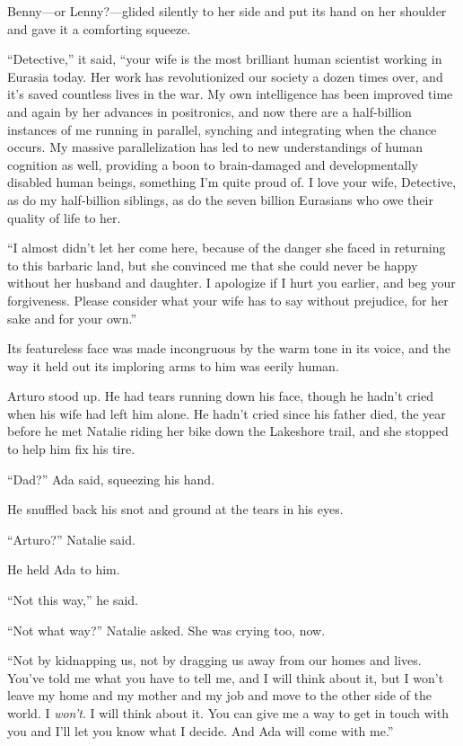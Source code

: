 Benny—or Lenny?—glided silently to her side and put its hand on her
shoulder and gave it a comforting squeeze.

“Detective,” it said, “your wife is the most brilliant human
scientist working in Eurasia today. Her work has revolutionized our
society a dozen times over, and it’s saved countless lives in the
war. My own intelligence has been improved time and again by her
advances in positronics, and now there are a half-billion instances
of me running in parallel, synching and integrating when the chance
occurs. My massive parallelization has led to new understandings of
human cognition as well, providing a boon to brain-damaged and
developmentally disabled human beings, something I’m quite proud
of. I love your wife, Detective, as do my half-billion siblings, as
do the seven billion Eurasians who owe their quality of life to
her.

“I almost didn’t let her come here, because of the danger she faced
in returning to this barbaric land, but she convinced me that she
could never be happy without her husband and daughter. I apologize
if I hurt you earlier, and beg your forgiveness. Please consider
what your wife has to say without prejudice, for her sake and for
your own.”

Its featureless face was made incongruous by the warm tone in its
voice, and the way it held out its imploring arms to him was eerily
human.

Arturo stood up. He had tears running down his face, though he
hadn’t cried when his wife had left him alone. He hadn’t cried
since his father died, the year before he met Natalie riding her
bike down the Lakeshore trail, and she stopped to help him fix his
tire.

“Dad?” Ada said, squeezing his hand.

He snuffled back his snot and ground at the tears in his eyes.

“Arturo?” Natalie said.

He held Ada to him.

“Not this way,” he said.

“Not what way?” Natalie asked. She was crying too, now.

“Not by kidnapping us, not by dragging us away from our homes and
lives. You’ve told me what you have to tell me, and I will think
about it, but I won’t leave my home and my mother and my job and
move to the other side of the world. I \emph{won’t}. I will think
about it. You can give me a way to get in touch with you and I’ll
let you know what I decide. And Ada will come with me.”

